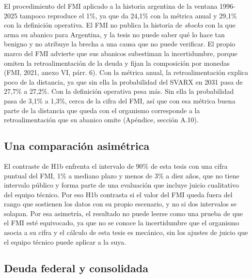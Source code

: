 El procedimiento del FMI aplicado a la historia argentina de la ventana
1996-2025 tampoco reproduce el 1\%, ya que da 24,1\% con la métrica
anual y 29,1\% con la definición operativa. El FMI no publica la
historia de \emph{shocks} con la que arma su abanico para Argentina, y
la tesis no puede saber qué lo hace tan benigno y no atribuye la brecha
a una causa que no puede verificar. El propio marco del FMI advierte que
sus abanicos subestiman la incertidumbre, porque omiten la
retroalimentación de la deuda y fijan la composición por monedas (FMI,
2021, anexo VI, párr. 6). Con la métrica anual, la retroalimentación
explica poco de la distancia, ya que sin ella la probabilidad del SVARX
en 2031 pasa de 27,7\% a 27,2\%. Con la definición operativa pesa más.
Sin ella la probabilidad pasa de 3,1\% a 1,3\%, cerca de la cifra del
FMI, así que con esa métrica buena parte de la distancia que queda con
el organismo corresponde a la retroalimentación que su abanico omite
(Apéndice, sección A.10).

\subsection{Una comparación asimétrica}

El contraste de H1b enfrenta el intervalo de 90\% de esta tesis con una
cifra puntual del FMI, 1\% a mediano plazo y menos de 3\% a diez años,
que no tiene intervalo público y forma parte de una evaluación que
incluye juicio cualitativo del equipo técnico. Por eso H1b contrasta si
el valor del FMI queda fuera del rango que sostienen los datos con su
propio escenario, y no si dos intervalos se solapan. Por esa asimetría,
el resultado no puede leerse como una prueba de que el FMI esté
equivocado, ya que no se conoce la incertidumbre que el organismo asocia
a su cifra y el cálculo de esta tesis es mecánico, sin los ajustes de
juicio que el equipo técnico puede aplicar a la suya.

\subsection{Deuda federal y consolidada}

